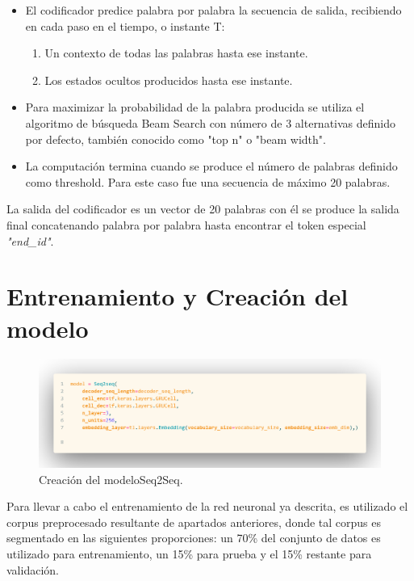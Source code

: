 \documentclass[12pt, letterpaper]{article}
\begin{document}
\begin{itemize}
\begin{itemize}
                \item El codificador predice palabra por palabra la secuencia de salida, recibiendo en cada paso en el tiempo, o instante T:
                \begin{enumerate}
                    \item Un contexto de todas las palabras hasta ese instante.
                    \item Los estados ocultos producidos hasta ese instante.
                \end{enumerate}
                \item Para maximizar la probabilidad de la palabra producida se utiliza el algoritmo de búsqueda Beam Search con número de 3 alternativas definido por defecto, también conocido como "top n" o "beam width".
                \item La computación termina cuando se produce el número de palabras definido como threshold. Para este caso fue una secuencia de máximo 20 palabras.
            \end{itemize}
        \end{itemize}

        La salida del codificador es un vector de 20 palabras con él se produce la salida final concatenando palabra por palabra hasta encontrar el token especial \emph{"end\_id"}\cite{tensorlayer2017}\cite{gfg_seq2seq}.

    \section{Entrenamiento y Creación del modelo}
        \begin{figure}[H]
            \centering
            \includegraphics[width=0.8\linewidth]{img/code/seq2seq_model.png}
            \caption{Creación del modeloSeq2Seq.}
        \end{figure}

        Para llevar a cabo el entrenamiento de la red neuronal ya descrita, es utilizado el corpus preprocesado resultante de apartados anteriores, donde tal corpus es segmentado en las siguientes proporciones: un 70\% del conjunto de datos es utilizado para entrenamiento, un 15\% para prueba y el 15\% restante para validación\cite{Britz_2015}.
\end{document}
